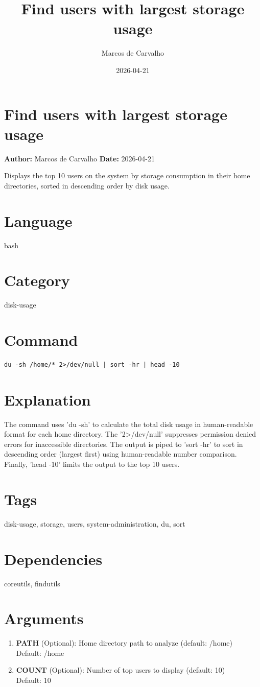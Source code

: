 \documentclass{article}
\title{Find users with largest storage usage}
\author{Marcos de Carvalho}
\date{2026-04-21}
\begin{document}
\section*{Find users with largest storage usage}
\textbf{Author:} Marcos de Carvalho \hfill \textbf{Date:} 2026-04-21

\noindent Displays the top 10 users on the system by storage consumption in their home directories, sorted in descending order by disk usage.

\section*{Language}
bash

\section*{Category}
disk-usage

\section*{Command}
\begin{lstlisting}
du -sh /home/* 2>/dev/null | sort -hr | head -10
\end{lstlisting}

\section*{Explanation}
The command uses 'du -sh' to calculate the total disk usage in human-readable format for each home directory. The '2>/dev/null' suppresses permission denied errors for inaccessible directories. The output is piped to 'sort -hr' to sort in descending order (largest first) using human-readable number comparison. Finally, 'head -10' limits the output to the top 10 users.

\section*{Tags}
disk-usage, storage, users, system-administration, du, sort

\section*{Dependencies}
coreutils, findutils


\section*{Arguments}
\begin{enumerate}
  \item \textbf{PATH} (Optional): Home directory path to analyze (default: /home) \\ Default: /home
  \item \textbf{COUNT} (Optional): Number of top users to display (default: 10) \\ Default: 10
\end{enumerate}
\end{document}
